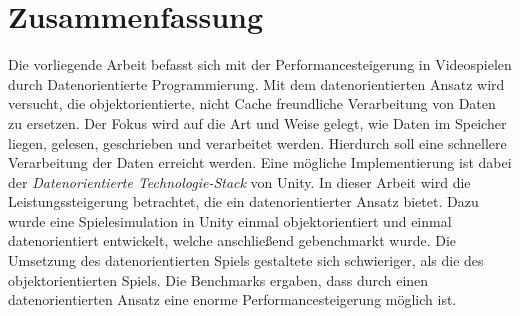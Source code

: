 \thispagestyle{empty}
\section*{Zusammenfassung}
Die vorliegende Arbeit befasst sich mit der Performancesteigerung in Videospielen durch Datenorientierte Programmierung. Mit dem datenorientierten Ansatz wird versucht, die objektorientierte, nicht Cache freundliche Verarbeitung von Daten zu ersetzen. Der Fokus wird auf die Art und Weise gelegt, wie Daten im Speicher liegen, gelesen, geschrieben und verarbeitet werden. Hierdurch soll eine schnellere Verarbeitung der Daten erreicht werden. Eine mögliche Implementierung ist dabei der \textit{Datenorientierte Technologie-Stack} von Unity. In dieser Arbeit wird die Leistungssteigerung betrachtet, die ein datenorientierter Ansatz bietet. Dazu wurde eine Spielesimulation in Unity einmal objektorientiert und einmal datenorientiert entwickelt, welche anschließend gebenchmarkt wurde. Die Umsetzung des datenorientierten Spiels gestaltete sich schwieriger, als die des objektorientierten Spiels. Die Benchmarks ergaben, dass durch einen datenorientierten Ansatz eine enorme Performancesteigerung möglich ist.